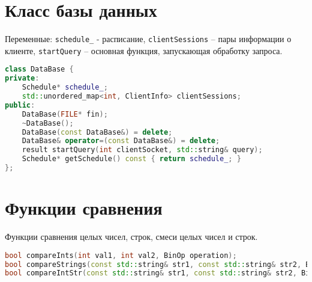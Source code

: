 \documentclass{article}
\begin{document}
\section*{Класс базы данных}

Переменные: \texttt{schedule\_} - расписание, \texttt{clientSessions} – пары информации о клиенте, \texttt{startQuery} – основная функция, запускающая обработку запроса.

\begin{lstlisting}[language=C++]
class DataBase {
private:
    Schedule* schedule_;
    std::unordered_map<int, ClientInfo> clientSessions;
public:
    DataBase(FILE* fin);
    ~DataBase();
    DataBase(const DataBase&) = delete;
    DataBase& operator=(const DataBase&) = delete;
    result startQuery(int clientSocket, std::string& query);
    Schedule* getSchedule() const { return schedule_; }
};
\end{lstlisting}

\section*{Функции сравнения}

Функции сравнения целых чисел, строк, смеси целых чисел и строк.

\begin{lstlisting}[language=C++]
bool compareInts(int val1, int val2, BinOp operation);
bool compareStrings(const std::string& str1, const std::string& str2, BinOp operation);
bool compareIntStr(const std::string& str1, const std::string& str2, BinOp operation);
\end{lstlisting}
\end{document}
